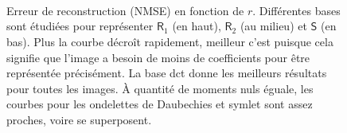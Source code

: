 \begin{figure}[t]
    \centering
    \\
    \\
    \\
    \caption{Erreur de reconstruction (NMSE) en fonction de $r$. Différentes bases sont étudiées pour représenter $\mathsf{R}_1$ (en haut), $\mathsf{R}_2$ (au milieu) et $\mathsf{S}$ (en bas). Plus la courbe décroît rapidement, meilleur c'est puisque cela signifie que l'image a besoin de moins de coefficients pour être représentée précisément. La base \gls{dct} donne les meilleurs résultats pour toutes les images. \`A quantité de moments nuls éguale, les courbes pour les ondelettes de Daubechies et symlet sont assez proches, voire se superposent.
        \protect\label{fig-best-basis}}
\end{figure}





